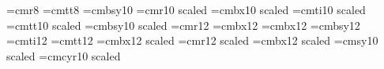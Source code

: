 

   











 
\nopagenumbers

\font\small=cmr8
\font\smalltt=cmtt8
\font\normalbsy=cmbsy10 %
\font\medium=cmr10 scaled \magstephalf
\font\mediumbx=cmbx10 scaled \magstephalf
\font\mediumit=cmti10 scaled \magstephalf
\font\mediumtt=cmtt10 scaled \magstephalf
\font\mediumbsy=cmbsy10 scaled \magstephalf %
\font\large=cmr12
\font\largebx=cmbx12
\font\largebx=cmbx12
\font\largebsy=cmbsy12  %
\font\largeit=cmti12
\font\largett=cmtt12
\font\Largebx=cmbx12 scaled \magstephalf
\font\huge=cmr12 scaled 
\font\hugebx=cmbx12 scaled 
\font\mediumsy=cmsy10 scaled \magstephalf
\font\mediumcy=cmcyr10 scaled \magstephalf

